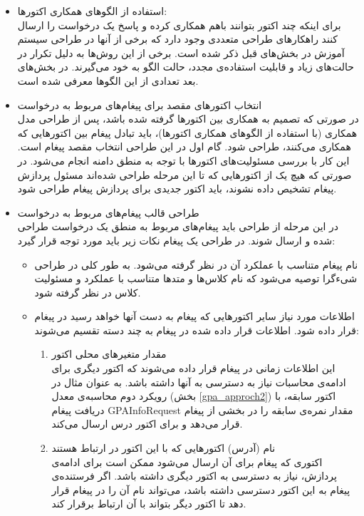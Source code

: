\begin{itemize}
\item استفاده از الگوهای همکاری اکتورها:\\
برای اینکه چند اکتور بتوانند باهم همکاری کرده و پاسخ یک درخواست را ارسال کنند راهکارهای طراحی متعددی وجود دارد که برخی از آنها در طراحی سیستم آموزش در بخش‌های قبل ذکر شده است. برخی از این روش‌ها به دلیل تکرار در حالت‌های زیاد و قابلیت استفاده‌ی مجدد، حالت الگو به خود می‌گیرند. در بخش‌های بعد تعدادی از این الگوها معرفی شده است.
\item انتخاب اکتورهای مقصد برای پیغام‌های مربوط به درخواست\\
در صورتی که تصمیم به همکاری بین اکتورها گرفته شده باشد، پس از طراحی مدل همکاری (با استفاده از الگوهای همکاری اکتورها)، باید تبادل پیغام بین اکتورهایی که همکاری می‌کنند، طراحی شود. گام اول در این طراحی انتخاب مقصد پیغام است. این کار با بررسی مسئولیت‌های اکتورها با توجه به منطق دامنه انجام می‌شود. در صورتی که هیچ یک از اکتورهایی که تا این مرحله طراحی شده‌اند مسئول پردازش پیغام تشخیص داده نشوند،‌ باید اکتور جدیدی برای پردازش پیغام طراحی شود.
\item طراحی قالب پیغام‌های مربوط به درخواست\\
در این مرحله از طراحی باید پیغام‌های مربوط به منطق یک درخواست طراحی شده و ارسال شوند. در طراحی یک پیغام نکات زیر باید مورد توجه قرار گیرد:
\begin{itemize}
\item نام پیغام متناسب با عملکرد آن در نظر گرفته می‌شود. 
به طور کلی در طراحی شیءگرا توصیه می‌شود که نام کلاس‌ها و متدها متناسب با عملکرد و مسئولیت کلاس در نظر گرفته شود.
\item اطلاعات مورد نیاز سایر اکتورهایی که پیغام به دست‌ آنها خواهد رسید در پیغام قرار داده شود.
اطلاعات قرار داده شده در پیغام به چند دسته تقسیم می‌شوند:\\
\begin{enumerate}
\item مقدار متغیر‌های محلی اکتور\\
 این اطلاعات زمانی در پیغام قرار داده می‌شوند که اکتور دیگری برای ادامه‌ی محاسبات نیاز به دسترسی به آنها داشته باشد. به عنوان مثال در رویکرد دوم محاسبه‌ی معدل (بخش \ref{gpa_approch2}) اکتور سابقه، با دریافت پیغام GPAInfoRequest مقدار نمره‌ی سابقه را در بخشی از پیغام قرار می‌دهد و برای اکتور درس ارسال می‌کند.
\item نام (آدرس) اکتورهایی که با این اکتور در ارتباط هستند\\
اکتوری که پیغام برای آن ارسال می‌شود ممکن است برای ادامه‌ی پردازش، نیاز به دسترسی به اکتور دیگری داشته باشد. اگر فرستنده‌ی پیغام به این اکتور دسترسی داشته باشد، می‌تواند نام آن را در پیغام قرار دهد تا اکتور دیگر بتواند با آن ارتباط برقرار کند.

\end{enumerate}
\end{itemize}
\end{itemize}
